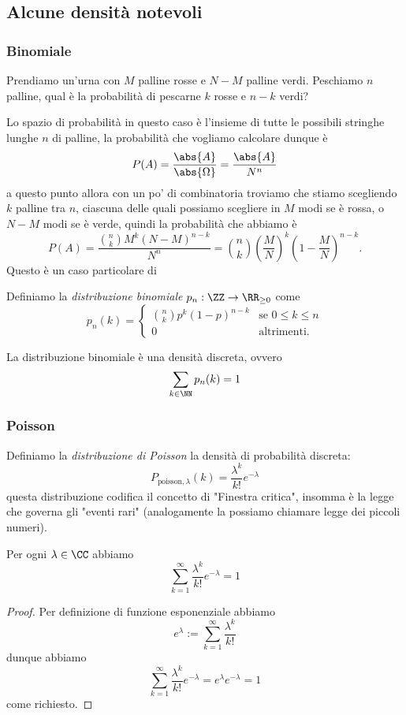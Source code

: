 \documentclass[11pt]{scrartcl}
\begin{document}
	\subsection{Alcune densità notevoli}
	\subsubsection{Binomiale}
	\begin{example}
		Prendiamo un'urna con $M$ palline rosse e $N-M$ palline verdi. Peschiamo $n$ palline, qual è la probabilità di pescarne $k$ rosse e $n-k$ verdi?
	\end{example}
	Lo spazio di probabilità in questo caso è l'insieme di tutte le possibili stringhe lunghe $n$ di palline, la probabilità che vogliamo calcolare dunque è
	$$P(A)=\frac{\abs{A}}{\abs{\Omega}}=\frac{\abs{A}}{N^n}$$
	a questo punto allora con un po' di combinatoria troviamo che stiamo scegliendo $k$ palline tra $n$, ciascuna delle quali possiamo scegliere in $M$ modi se è rossa, o $N-M$ modi se è verde, quindi la probabilità che abbiamo è
	$$P(A)=\frac{\binom{n}{k}M^k(N-M)^{n-k}}{N^n}=\binom{n}{k}\left(\frac{M}{N}\right)^k\left(1-\frac{M}{N}\right)^{n-k}.$$
	Questo è un caso particolare di
	\begin{definition}
		Definiamo la \textit{distribuzione binomiale}  $p_n:\ZZ\to \RR_{\ge 0}$ come
		$$p_n(k)=\begin{cases}
			\binom{n}{k}p^k(1-p)^{n-k} & \text{se $0\le k\le n$} \\
			0 & \text{altrimenti.}
		\end{cases}$$
	\end{definition}
	\begin{proposition}
		La distribuzione binomiale è una densità discreta, ovvero
		$$\sum_{k\in\NN}p_n(k)=1$$
	\end{proposition}
	\subsubsection{Poisson}
	\begin{definition}[Poisson]
		Definiamo la \textit{distribuzione di Poisson} la densità di probabilità discreta:
		$$P_{\text{poisson},\lambda}(k)=\frac{\lambda^k}{k!}e^{-\lambda}$$
		questa distribuzione codifica il concetto di "Finestra critica", insomma è la legge che governa gli "eventi rari" (analogamente la possiamo chiamare legge dei piccoli numeri).
	\end{definition}
	\begin{proposition}
		Per ogni $\lambda\in\CC$ abbiamo
		$$\sum_{k=1}^{\infty}\frac{\lambda^k}{k!}e^{-\lambda}=1$$
	\end{proposition}
	\begin{proof}
		Per definizione di funzione esponenziale abbiamo
		$$e^\lambda:=\sum_{k=1}^{\infty}\frac{\lambda^k}{k!}$$
		dunque abbiamo
		$$\sum_{k=1}^{\infty}\frac{\lambda^k}{k!}e^{-\lambda}=e^\lambda e^{-\lambda}=1$$
		come richiesto.
	\end{proof}
	\newpage 
	
\end{document}
